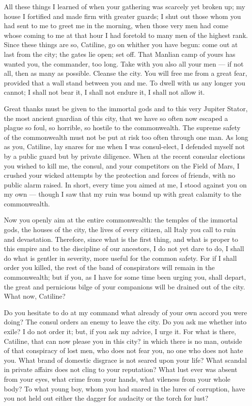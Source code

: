  All these things I learned of when your gathering was scarcely yet broken up; my house I fortified and made firm with greater guards; I shut out those whom you had sent to me to greet me in the morning, when those very men had come whose coming to me at that hour I had foretold to many men of the highest rank. Since these things are so, Catiline, go on whither you have begun: come out at last from the city; the gates lie open; set off. That Manlian camp of yours has wanted you, the commander, too long. Take with you also all your men --- if not all, then as many as possible. Cleanse the city. You will free me from a great fear, provided that a wall stand between you and me. To dwell with us any longer you cannot; I shall not bear it, I shall not endure it, I shall not allow it.

 Great thanks must be given to the immortal gods and to this very Jupiter Stator, the most ancient guardian of this city, that we have so often now escaped a plague so foul, so horrible, so hostile to the commonwealth. The supreme safety of the commonwealth must not be put at risk too often through one man. As long as you, Catiline, lay snares for me when I was consul-elect, I defended myself not by a public guard but by private diligence. When at the recent consular elections you wished to kill me, the consul, and your competitors on the Field of Mars, I crushed your wicked attempts by the protection and forces of friends, with no public alarm raised. In short, every time you aimed at me, I stood against you on my own --- though I saw that my ruin was bound up with great calamity to the commonwealth.

 Now you openly aim at the entire commonwealth: the temples of the immortal gods, the houses of the city, the lives of every citizen, all Italy you call to ruin and devastation. Therefore, since what is the first thing, and what is proper to this empire and to the discipline of our ancestors, I do not yet dare to do, I shall do what is gentler in severity, more useful for the common safety. For if I shall order you killed, the rest of the band of conspirators will remain in the commonwealth; but if you, as I have for some time been urging you, shall depart, the great and pernicious bilge of your companions will be drained out of the city. What now, Catiline?

 Do you hesitate to do at my command what already of your own accord you were doing? The consul orders an enemy to leave the city. Do you ask me whether into exile? I do not order it; but, if you ask my advice, I urge it. For what is there, Catiline, that can now please you in this city? in which there is no man, outside of that conspiracy of lost men, who does not fear you, no one who does not hate you. What brand of domestic disgrace is not seared upon your life? What scandal in private affairs does not cling to your reputation? What lust ever was absent from your eyes, what crime from your hands, what vileness from your whole body? To what young boy, whom you had snared in the lures of corruption, have you not held out either the dagger for audacity or the torch for lust?

